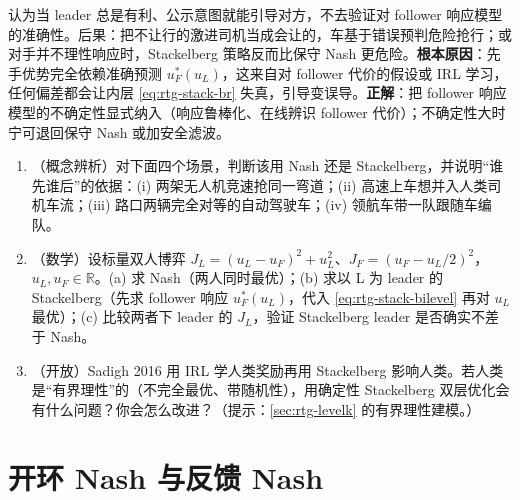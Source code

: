 \begin{pitfall}
认为当 leader 总是有利、公示意图就能引导对方，不去验证对 follower 响应模型的准确性。后果：把不让行的激进司机当成会让的，车基于错误预判危险抢行；或对手并不理性响应时，Stackelberg 策略反而比保守 Nash 更危险。\textbf{根本原因}：先手优势完全依赖准确预测 $u_F^*(u_L)$，这来自对 follower 代价的假设或 IRL 学习，任何偏差都会让内层 \cref{eq:rtg-stack-br} 失真，引导变误导。\textbf{正解}：把 follower 响应模型的不确定性显式纳入（响应鲁棒化、在线辨识 follower 代价）；不确定性大时宁可退回保守 Nash 或加安全滤波。
\end{pitfall}

\begin{practice}
\begin{enumerate}
  \item （概念辨析）对下面四个场景，判断该用 Nash 还是 Stackelberg，并说明“谁先谁后”的依据：(i) 两架无人机竞速抢同一弯道；(ii) 高速上车想并入人类司机车流；(iii) 路口两辆完全对等的自动驾驶车；(iv) 领航车带一队跟随车编队。
  \item （数学）设标量双人博弈 $J_L=(u_L-u_F)^2+u_L^2$、$J_F=(u_F-u_L/2)^2$，$u_L,u_F\in\mathbb{R}$。(a) 求 Nash（两人同时最优）；(b) 求以 L 为 leader 的 Stackelberg（先求 follower 响应 $u_F^*(u_L)$，代入 \cref{eq:rtg-stack-bilevel} 再对 $u_L$ 最优）；(c) 比较两者下 leader 的 $J_L$，验证 Stackelberg leader 是否确实不差于 Nash。
  \item （开放）Sadigh 2016 用 IRL 学人类奖励再用 Stackelberg 影响人类。若人类是“有界理性”的（不完全最优、带随机性），用确定性 Stackelberg 双层优化会有什么问题？你会怎么改进？（提示：\cref{sec:rtg-levelk} 的有界理性建模。）
\end{enumerate}
\end{practice}

\section{开环 Nash 与反馈 Nash}
\label{sec:rtg-olne-fbne}

